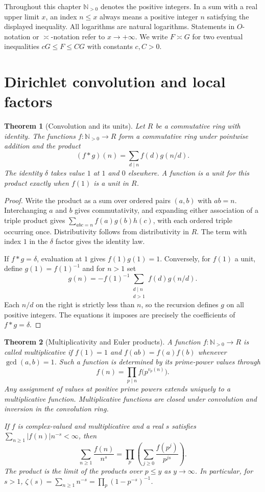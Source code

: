 \documentclass[11pt,oneside,openany]{book}
\theoremstyle{plain}
\newtheorem{theorem}{Theorem}[chapter]
\theoremstyle{definition}
\theoremstyle{remark}
\begin{document}
Throughout this chapter \(\mathbb N_{>0}\) denotes the positive integers.
In a sum with a real upper limit \(x\), an index \(n\le x\) always means a
positive integer \(n\) satisfying the displayed inequality. All logarithms
are natural logarithms. Statements in \(O\)-notation or \(\asymp\)-notation
refer to \(x\to+\infty\). We write \(F\asymp G\) for two eventual inequalities
\(cG\le F\le CG\) with constants \(c,C>0\).

\section{Dirichlet convolution and local factors}

\begin{theorem}[Convolution and its units]\label{nt:C01}
Let \(R\) be a commutative ring with identity. The functions
\(f\colon\mathbb N_{>0}\to R\) form a commutative ring under pointwise
addition and the product
\[
 (f*g)(n)=\sum_{d\mid n}f(d)g(n/d).
\]
The identity \(\delta\) takes value \(1\) at \(1\) and \(0\) elsewhere.
A function is a unit for this product exactly when \(f(1)\) is a unit in \(R\).
\end{theorem}

\begin{proof}
Write the product as a sum over ordered pairs \((a,b)\) with \(ab=n\).
Interchanging \(a\) and \(b\) gives commutativity, and expanding either
association of a triple product gives
\(\sum_{abc=n}f(a)g(b)h(c)\), with each ordered triple occurring once.
Distributivity follows from distributivity in \(R\). The term with index
\(1\) in the \(\delta\) factor gives the identity law.

If \(f*g=\delta\), evaluation at \(1\) gives \(f(1)g(1)=1\).
Conversely, for \(f(1)\) a unit, define \(g(1)=f(1)^{-1}\) and for \(n>1\) set
\[
 g(n)=-f(1)^{-1}\sum_{\substack{d\mid n\\d>1}} f(d)g(n/d).
\]
Each \(n/d\) on the right is strictly less than \(n\), so the recursion
defines \(g\) on all positive integers. The equations it imposes are
precisely the coefficients of \(f*g=\delta\).
\end{proof}

\begin{theorem}[Multiplicativity and Euler products]\label{nt:C02}
A function \(f\colon\mathbb N_{>0}\to R\) is called multiplicative if
\(f(1)=1\) and \(f(ab)=f(a)f(b)\) whenever \(\gcd(a,b)=1\). Such a function
is determined by its prime-power values through
\[
 f(n)=\prod_{p\mid n} f\bigl(p^{v_p(n)}\bigr).
\]
Any assignment of values at positive prime powers extends uniquely to a
multiplicative function. Multiplicative functions are closed under
convolution and inversion in the convolution ring.

If \(f\) is complex-valued and multiplicative and a real \(s\) satisfies
\(\sum_{n\ge1}|f(n)|n^{-s}<\infty\), then
\[
 \sum_{n\ge1}\frac{f(n)}{n^s}
   =\prod_p\left(\sum_{j\ge0}\frac{f(p^j)}{p^{js}}\right).
\]
The product is the limit of the products over \(p\le y\) as \(y\to\infty\).
In particular, for \(s>1\),
\(\zeta(s)=\sum_{n\ge1} n^{-s}=\prod_p(1-p^{-s})^{-1}\).
\end{theorem}
\end{document}
